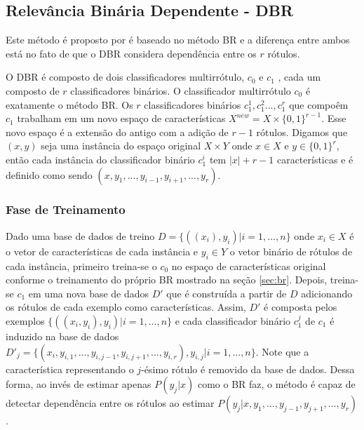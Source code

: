 \subsection{Relevância Binária Dependente - DBR}
\label{sec:dbr}
Este método é proposto por \cite{dbr2014} é baseado no método BR
e a diferença entre ambos está no fato de 
que o DBR considera dependência entre os $r$ rótulos.

O DBR é composto de dois classificadores multirrótulo, $c_0$ e $c_1$ , 
cada um composto de $r$ classificadores binários. O classificador multirrótulo $c_0$ é
exatamente o método BR. Os $r$ classificadores binários $c_1^1,c_1^2...,c_1^r$ que compoêm $c_1$ 
  trabalham em um novo espaço de características $X^{new}=X \times \{0,1\}^{r-1}$.
  Esse novo espaço é a extensão do antigo com a adição de $r-1$ rótulos.
  Digamos que $(x,y)$ seja uma instância do espaço original $X \times Y$
  onde $x \in X$ e $y \in {\{0,1\}}^{r}$, então cada instância
  do classificador binário $c_1^i$ tem $|x|+r-1$ características
  e é definido como sendo $(x,y_1,...,y_{i-1},y_{i+1},...,y_{r})$.
  
  \subsubsection{Fase de Treinamento}
  Dado uma base de dados de treino $D=\{((x_i),y_i)|i=1,...,n\}$ onde $x_i \in X$ é o vetor de características de cada instância
  e $y_i \in Y$ o vetor binário de rótulos de cada instância,
  primeiro treina-se o $c_0$
  no espaço de características original conforme o treinamento do próprio BR mostrado na seção \ref{sec:br}.
  Depois, treina-se $c_1$ em uma nova base de dados $D'$ que é construída a partir de $D$ adicionando os rótulos de cada
  exemplo como características. Assim, $D'$ é composta pelos exemplos $\{((x_i,y_i),y_i) |i=1,...,n\}$ e
  cada classificador binário $c_1^j$ de $c_1$ é induzido na base de dados $D'_j=\{(x_i,y_{i,1},...,y_{i,j-1},y_{i,j+1},...,y_{i,r}),y_{i,j} | i=1,...,n\}$.
  Note que a característica representando o $j$-ésimo rótulo é removido da base de dados.
  Dessa forma, ao invés de estimar apenas $P(y_j|x)$ como o BR faz, o método é capaz de detectar dependência entre os rótulos ao
  estimar $P(y_j|x,y_1,...,y_{j-1},y_{j+1},...,y_r)$.
  
